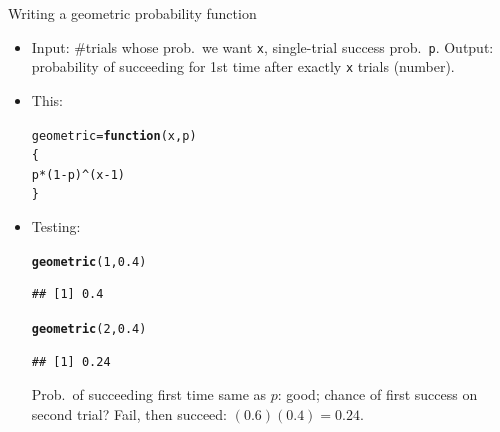 \documentclass[unknownkeysallowed]{beamer}\usepackage[]{graphicx}\usepackage[]{color}
\makeatletter
\newcommand{\hlnum}[1]{\textcolor[rgb]{0.686,0.059,0.569}{#1}}%
\newcommand{\hlopt}[1]{\textcolor[rgb]{0,0,0}{#1}}%
\newcommand{\hlstd}[1]{\textcolor[rgb]{0.345,0.345,0.345}{#1}}%
\newcommand{\hlkwa}[1]{\textcolor[rgb]{0.161,0.373,0.58}{\textbf{#1}}}%
\newcommand{\hlkwb}[1]{\textcolor[rgb]{0.69,0.353,0.396}{#1}}%
\newcommand{\hlkwc}[1]{\textcolor[rgb]{0.333,0.667,0.333}{#1}}%
\newcommand{\hlkwd}[1]{\textcolor[rgb]{0.737,0.353,0.396}{\textbf{#1}}}%
\newenvironment{kframe}{%
 \def\at@end@of@kframe{}%
 \ifinner\ifhmode%
  \def\at@end@of@kframe{\end{minipage}}%
  \begin{minipage}{\columnwidth}%
 \fi\fi%
 \def\FrameCommand##1{\hskip\@totalleftmargin \hskip-\fboxsep
 \colorbox{shadecolor}{##1}\hskip-\fboxsep
     \hskip-\linewidth \hskip-\@totalleftmargin \hskip\columnwidth}%
 \MakeFramed {\advance\hsize-\width
   \@totalleftmargin\z@ \linewidth\hsize
   \@setminipage}}%
 {\par\unskip\endMakeFramed%
 \at@end@of@kframe}
\newenvironment{knitrout}{}{} %
\makeatother
\begin{document}
\begin{frame}[fragile]{Writing a geometric probability function}

  \begin{itemize}
  \item Input: \#trials whose prob.\ we want \texttt{x}, single-trial
    success prob.\ \texttt{p}. Output: probability of succeeding for
    1st time after exactly \texttt{x} trials (number).
\item This:
  \begin{small}
\begin{knitrout}
\color{fgcolor}\begin{kframe}
\begin{alltt}
\hlstd{geometric}\hlkwb{=}\hlkwa{function}\hlstd{(}\hlkwc{x}\hlstd{,}\hlkwc{p}\hlstd{)}
  \hlstd{\{}
    \hlstd{p}\hlopt{*}\hlstd{(}\hlnum{1}\hlopt{-}\hlstd{p)}\hlopt{^}\hlstd{(x}\hlopt{-}\hlnum{1}\hlstd{)}
  \hlstd{\}}
\end{alltt}
\end{kframe}
\end{knitrout}
  \end{small}

\item Testing:
  \begin{small}
\begin{knitrout}
\color{fgcolor}\begin{kframe}
\begin{alltt}
\hlkwd{geometric}\hlstd{(}\hlnum{1}\hlstd{,}\hlnum{0.4}\hlstd{)}
\end{alltt}
\begin{verbatim}
## [1] 0.4
\end{verbatim}
\begin{alltt}
\hlkwd{geometric}\hlstd{(}\hlnum{2}\hlstd{,}\hlnum{0.4}\hlstd{)}
\end{alltt}
\begin{verbatim}
## [1] 0.24
\end{verbatim}
\end{kframe}
\end{knitrout}
  \end{small}
Prob.\ of succeeding first time same as $p$: good; chance of first success on second trial? Fail, then succeed:
$(0.6)(0.4)=0.24$.


  \end{itemize}
  
\end{frame}
\end{document}
